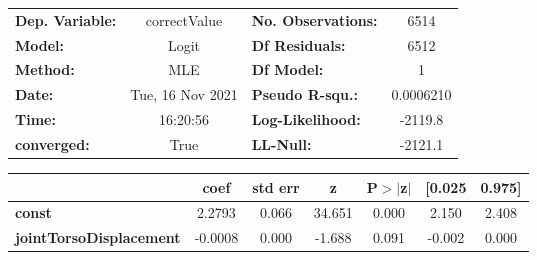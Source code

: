 \begin{center}
\begin{tabular}{lclc}
\toprule
\textbf{Dep. Variable:}         &   correctValue   & \textbf{  No. Observations:  } &     6514    \\
\textbf{Model:}                 &      Logit       & \textbf{  Df Residuals:      } &     6512    \\
\textbf{Method:}                &       MLE        & \textbf{  Df Model:          } &        1    \\
\textbf{Date:}                  & Tue, 16 Nov 2021 & \textbf{  Pseudo R-squ.:     } & 0.0006210   \\
\textbf{Time:}                  &     16:20:56     & \textbf{  Log-Likelihood:    } &   -2119.8   \\
\textbf{converged:}             &       True       & \textbf{  LL-Null:           } &   -2121.1   \\
\bottomrule
\end{tabular}
\begin{tabular}{lcccccc}
                                & \textbf{coef} & \textbf{std err} & \textbf{z} & \textbf{P$> |$z$|$} & \textbf{[0.025} & \textbf{0.975]}  \\
\midrule
\textbf{const}                  &       2.2793  &        0.066     &    34.651  &         0.000        &        2.150    &        2.408     \\
\textbf{jointTorsoDisplacement} &      -0.0008  &        0.000     &    -1.688  &         0.091        &       -0.002    &        0.000     \\
\bottomrule
\end{tabular}
\end{center}
